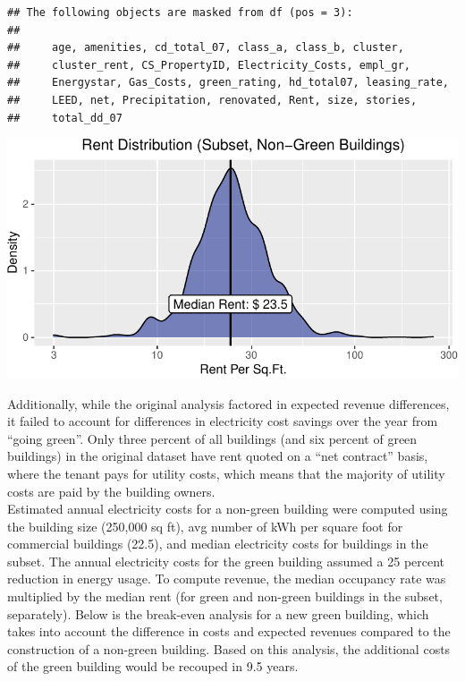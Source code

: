\documentclass[
]{article}
\begin{document}
\begin{verbatim}
## The following objects are masked from df (pos = 3):
## 
##     age, amenities, cd_total_07, class_a, class_b, cluster,
##     cluster_rent, CS_PropertyID, Electricity_Costs, empl_gr,
##     Energystar, Gas_Costs, green_rating, hd_total07, leasing_rate,
##     LEED, net, Precipitation, renovated, Rent, size, stories,
##     total_dd_07
\end{verbatim}

\begin{center}\includegraphics{STA380Exercises_Ofunrein_Pflum_Robinson_Vincent_files/figure-latex/unnamed-chunk-5-2} \end{center}

Additionally, while the original analysis factored in expected revenue
differences, it failed to account for differences in electricity cost
savings over the year from ``going green''. Only three percent of all
buildings (and six percent of green buildings) in the original dataset
have rent quoted on a ``net contract'' basis, where the tenant pays for
utility costs, which means that the majority of utility costs are paid
by the building owners.\\
Estimated annual electricity costs for a non-green building were
computed using the building size (250,000 sq ft), avg number of kWh per
square foot for commercial buildings (22.5), and median electricity
costs for buildings in the subset. The annual electricity costs for the
green building assumed a 25 percent reduction in energy usage. To
compute revenue, the median occupancy rate was multiplied by the median
rent (for green and non-green buildings in the subset, separately).
Below is the break-even analysis for a new green building, which takes
into account the difference in costs and expected revenues compared to
the construction of a non-green building. Based on this analysis, the
additional costs of the green building would be recouped in 9.5 years.
\end{document}

